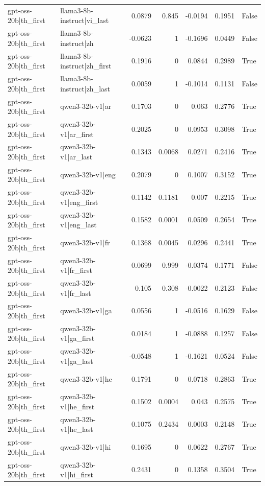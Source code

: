 \begin{table}
\begin{tabular}{l l r r r r l}
gpt-oss-20b|th_first & llama3-8b-instruct|vi_last & 0.0879 & 0.845 & -0.0194 & 0.1951 & False \\
gpt-oss-20b|th_first & llama3-8b-instruct|zh & -0.0623 & 1 & -0.1696 & 0.0449 & False \\
gpt-oss-20b|th_first & llama3-8b-instruct|zh_first & 0.1916 & 0 & 0.0844 & 0.2989 & True \\
gpt-oss-20b|th_first & llama3-8b-instruct|zh_last & 0.0059 & 1 & -0.1014 & 0.1131 & False \\
gpt-oss-20b|th_first & qwen3-32b-v1|ar & 0.1703 & 0 & 0.063 & 0.2776 & True \\
gpt-oss-20b|th_first & qwen3-32b-v1|ar_first & 0.2025 & 0 & 0.0953 & 0.3098 & True \\
gpt-oss-20b|th_first & qwen3-32b-v1|ar_last & 0.1343 & 0.0068 & 0.0271 & 0.2416 & True \\
gpt-oss-20b|th_first & qwen3-32b-v1|eng & 0.2079 & 0 & 0.1007 & 0.3152 & True \\
gpt-oss-20b|th_first & qwen3-32b-v1|eng_first & 0.1142 & 0.1181 & 0.007 & 0.2215 & True \\
gpt-oss-20b|th_first & qwen3-32b-v1|eng_last & 0.1582 & 0.0001 & 0.0509 & 0.2654 & True \\
gpt-oss-20b|th_first & qwen3-32b-v1|fr & 0.1368 & 0.0045 & 0.0296 & 0.2441 & True \\
gpt-oss-20b|th_first & qwen3-32b-v1|fr_first & 0.0699 & 0.999 & -0.0374 & 0.1771 & False \\
gpt-oss-20b|th_first & qwen3-32b-v1|fr_last & 0.105 & 0.308 & -0.0022 & 0.2123 & False \\
gpt-oss-20b|th_first & qwen3-32b-v1|ga & 0.0556 & 1 & -0.0516 & 0.1629 & False \\
gpt-oss-20b|th_first & qwen3-32b-v1|ga_first & 0.0184 & 1 & -0.0888 & 0.1257 & False \\
gpt-oss-20b|th_first & qwen3-32b-v1|ga_last & -0.0548 & 1 & -0.1621 & 0.0524 & False \\
gpt-oss-20b|th_first & qwen3-32b-v1|he & 0.1791 & 0 & 0.0718 & 0.2863 & True \\
gpt-oss-20b|th_first & qwen3-32b-v1|he_first & 0.1502 & 0.0004 & 0.043 & 0.2575 & True \\
gpt-oss-20b|th_first & qwen3-32b-v1|he_last & 0.1075 & 0.2434 & 0.0003 & 0.2148 & True \\
gpt-oss-20b|th_first & qwen3-32b-v1|hi & 0.1695 & 0 & 0.0622 & 0.2767 & True \\
gpt-oss-20b|th_first & qwen3-32b-v1|hi_first & 0.2431 & 0 & 0.1358 & 0.3504 & True \\

\end{tabular}
\end{table}
